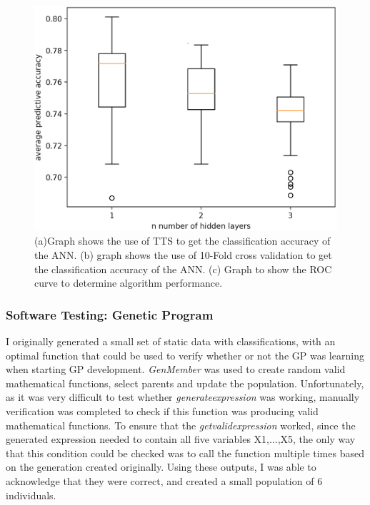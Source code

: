 \documentclass[11pt]{article}
\begin{document}
\begin{figure}[h]
\includegraphics[scale = .40]{reduc}
\caption{(a)Graph shows the use of TTS to get the classification accuracy of the ANN. (b) graph shows the use of 10-Fold cross validation to get the classification accuracy of the ANN. (c) Graph to show the ROC curve to determine algorithm performance. } 
\end{figure}
\subsubsection{Software Testing: Genetic Program}\label{subsubsec:STGP}
I originally generated a small set of static data with classifications, with an optimal function that could be used to verify whether or not the GP was learning when starting GP development.
\textit{GenMember} was used to create random valid mathematical functions, select parents and update the population. Unfortunately, as it was very difficult to test whether \textit{generate\textunderscore expression} was working, manually verification was completed to check if this function was producing valid mathematical functions. To ensure that the \textit{get\textunderscore valid\textunderscore expression} worked, since the generated expression needed to contain all five variables X1,...,X5, the only way that this condition could be checked was to call the function multiple times based on the generation created originally. Using these outputs, I was able to acknowledge that they were correct, and created a small population of 6 individuals. 
\end{document}
